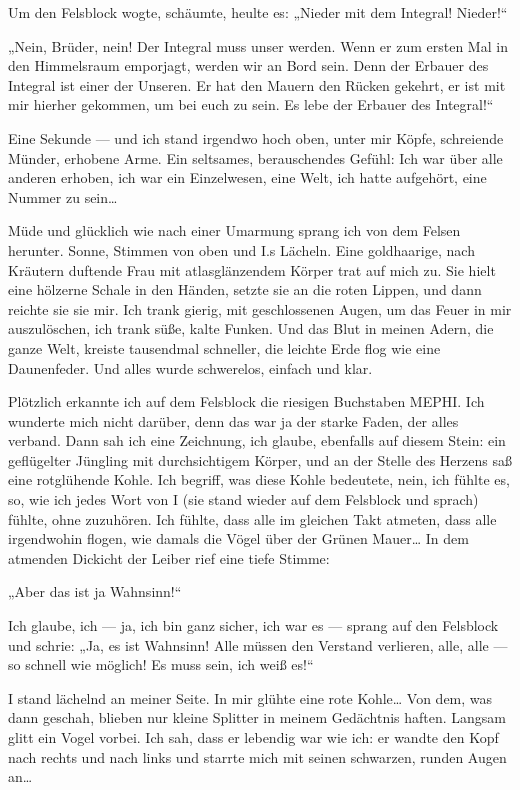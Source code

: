Um den Felsblock wogte, schäumte, heulte es: „Nieder mit dem
Integral! Nieder!“

„Nein, Brüder, nein! Der Integral muss unser werden. Wenn er zum
ersten Mal in den Himmelsraum emporjagt, werden wir an Bord sein.
Denn der Erbauer des Integral ist einer der Unseren. Er hat den
Mauern den Rücken gekehrt, er ist mit mir hierher gekommen, um bei
euch zu sein. Es lebe der Erbauer des Integral!“

Eine Sekunde — und ich stand irgendwo hoch oben, unter mir Köpfe,
schreiende Münder, erhobene Arme. Ein seltsames, berauschendes
Gefühl: Ich war über alle anderen erhoben, ich war ein Einzelwesen,
eine Welt, ich hatte aufgehört, eine Nummer zu sein\ldots{}

Müde und glücklich wie nach einer Umarmung sprang ich von dem
Felsen herunter. Sonne, Stimmen von oben und I.s Lächeln. Eine
goldhaarige, nach Kräutern duftende Frau mit atlasglänzendem Körper
trat auf mich zu. Sie hielt eine hölzerne Schale in den Händen,
setzte sie an die roten Lippen, und dann reichte sie sie mir. Ich
trank gierig, mit geschlossenen Augen, um das Feuer in mir
auszulöschen, ich trank süße, kalte Funken. Und das Blut in meinen
Adern, die ganze Welt, kreiste tausendmal schneller, die leichte
Erde flog wie eine Daunenfeder. Und alles wurde schwerelos, einfach
und klar.

Plötzlich erkannte ich auf dem Felsblock die riesigen Buchstaben
MEPHI. Ich wunderte mich nicht darüber, denn das war ja der starke
Faden, der alles verband. Dann sah ich eine Zeichnung, ich glaube,
ebenfalls auf diesem Stein: ein geflügelter Jüngling mit
durchsichtigem Körper, und an der Stelle des Herzens saß eine
rotglühende Kohle. Ich begriff, was diese Kohle bedeutete, nein,
ich fühlte es, so, wie ich jedes Wort von I (sie stand wieder auf
dem Felsblock und sprach) fühlte, ohne zuzuhören. Ich fühlte, dass
alle im gleichen Takt atmeten, dass alle irgendwohin flogen, wie
damals die Vögel über der Grünen Mauer\ldots{} In dem atmenden Dickicht
der Leiber rief eine tiefe Stimme:

„Aber das ist ja Wahnsinn!“

Ich glaube, ich — ja, ich bin ganz sicher, ich war es — sprang auf
den Felsblock und schrie: „Ja, es ist Wahnsinn! Alle müssen den
Verstand verlieren, alle, alle — so schnell wie möglich! Es muss
sein, ich weiß es!“

I stand lächelnd an meiner Seite. In mir glühte eine rote Kohle\ldots{}
Von dem, was dann geschah, blieben nur kleine Splitter in meinem
Gedächtnis haften. Langsam glitt ein Vogel vorbei. Ich sah, dass er
lebendig war wie ich: er wandte den Kopf nach rechts und nach links
und starrte mich mit seinen schwarzen, runden Augen an\ldots{}

